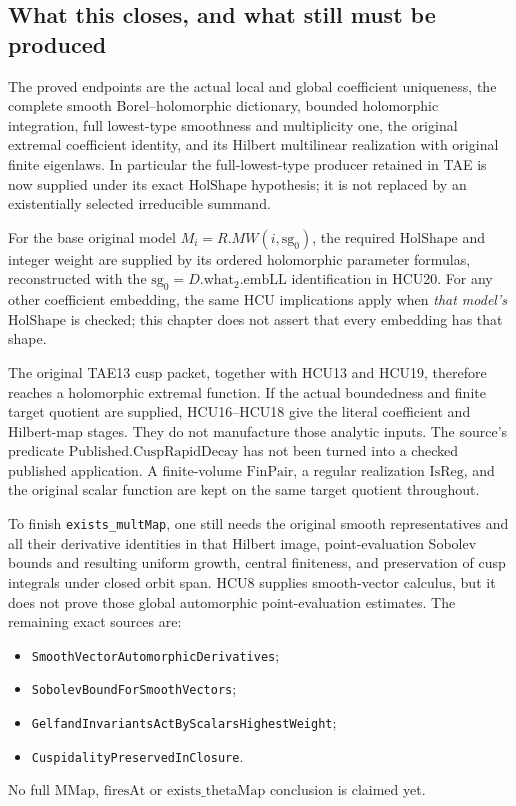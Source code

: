\subsection*{What this closes, and what still must be produced}

The proved endpoints are the actual local and global coefficient
uniqueness, the complete smooth Borel--holomorphic dictionary,
bounded holomorphic integration, full lowest-type smoothness and
multiplicity one, the original extremal coefficient identity,
and its Hilbert multilinear realization with original finite
eigenlaws.  In particular the full-lowest-type producer retained
in TAE is now supplied under its exact \(\mathrm{HolShape}\)
hypothesis; it is not replaced by an existentially selected
irreducible summand.

For the base original model \(M_i=R.MW(i,\mathrm{sg}_0)\), the required
\(\mathrm{HolShape}\) and integer weight are supplied by its ordered
holomorphic parameter formulas, reconstructed with the
\(\mathrm{sg}_0=D.\mathrm{what}_2.\mathrm{embLL}\) identification
in HCU20.  For any other coefficient embedding, the
same HCU implications apply when \emph{that model's}
\(\mathrm{HolShape}\) is checked; this chapter does not assert that
every embedding has that shape.

The original TAE13 cusp packet, together with HCU13 and HCU19,
therefore reaches a holomorphic extremal function.
If the actual boundedness and finite target quotient are supplied,
HCU16--HCU18 give the literal coefficient and Hilbert-map stages.
They do not manufacture those analytic inputs.
The source's predicate \(\mathrm{Published.CuspRapidDecay}\)
has not been turned into a checked published application.
A finite-volume \(\mathrm{FinPair}\), a regular realization
\(\mathrm{IsReg}\), and the original scalar function are kept
on the same target quotient throughout.

To finish \texttt{exists\_multMap}, one still needs the original
smooth representatives and all their derivative identities in that
Hilbert image, point-evaluation Sobolev bounds and resulting
uniform growth, central finiteness, and preservation of cusp
integrals under closed orbit span.  HCU8 supplies smooth-vector
calculus, but it does not prove those global automorphic
point-evaluation estimates.
The remaining exact sources are:
\begin{itemize}
\item \texttt{SmoothVectorAutomorphicDerivatives};
\item \texttt{SobolevBoundForSmoothVectors};
\item \texttt{GelfandInvariantsActByScalarsHighestWeight};
\item \texttt{CuspidalityPreservedInClosure}.
\end{itemize}
No full \(\mathrm{MMap}\), \(\mathrm{firesAt}\) or
\(\mathrm{exists\_thetaMap}\) conclusion is claimed yet.

